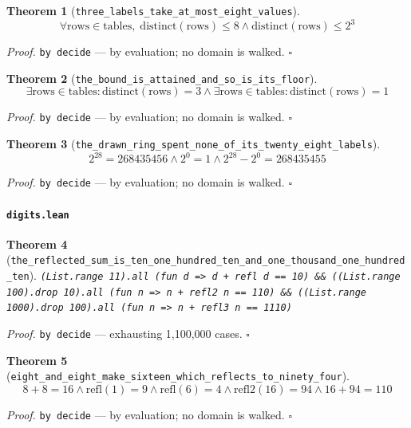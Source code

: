 \documentclass[11pt]{article}
\newtheorem{theorem}{Theorem}[section]
\begin{document}
\begin{theorem}[\texttt{three\_labels\_take\_at\_most\_eight\_values}]
\[ \forall \mathrm{rows} \in \mathrm{tables},\; \mathrm{distinct}\mathopen{}\left(\mathrm{rows}\right) \le 8 \land \mathrm{distinct}\mathopen{}\left(\mathrm{rows}\right) \le 2^{3} \]
\end{theorem}
\noindent\emph{Proof.} \texttt{by decide} --- by evaluation; no domain is walked. \hfill$\square$

\begin{theorem}[\texttt{the\_bound\_is\_attained\_and\_so\_is\_its\_floor}]
\[ \exists \mathrm{rows} \in \mathrm{tables} : \mathrm{distinct}\mathopen{}\left(\mathrm{rows}\right) = 3 \land \exists \mathrm{rows} \in \mathrm{tables} : \mathrm{distinct}\mathopen{}\left(\mathrm{rows}\right) = 1 \]
\end{theorem}
\noindent\emph{Proof.} \texttt{by decide} --- by evaluation; no domain is walked. \hfill$\square$

\begin{theorem}[\texttt{the\_drawn\_ring\_spent\_none\_of\_its\_twenty\_eight\_labels}]
\[ 2^{28} = 268435456 \land 2^{0} = 1 \land 2^{28} - 2^{0} = 268435455 \]
\end{theorem}
\noindent\emph{Proof.} \texttt{by decide} --- by evaluation; no domain is walked. \hfill$\square$

\paragraph{\texttt{digits.lean}}

\begin{theorem}[\texttt{the\_reflected\_sum\_is\_ten\_one\_hundred\_ten\_and\_one\_thousand\_one\_hundred\_ten}]
\texttt{(List.range 11).all (fun d => d + refl d == 10) \&\& ((List.range 100).drop 10).all (fun n => n + refl2 n == 110) \&\& ((List.range 1000).drop 100).all (fun n => n + refl3 n == 1110)}
\end{theorem}
\noindent\emph{Proof.} \texttt{by decide} --- exhausting 1,100,000 cases. \hfill$\square$

\begin{theorem}[\texttt{eight\_and\_eight\_make\_sixteen\_which\_reflects\_to\_ninety\_four}]
\[ 8 + 8 = 16 \land \mathrm{refl}\mathopen{}\left(1\right) = 9 \land \mathrm{refl}\mathopen{}\left(6\right) = 4 \land \mathrm{refl2}\mathopen{}\left(16\right) = 94 \land 16 + 94 = 110 \]
\end{theorem}
\noindent\emph{Proof.} \texttt{by decide} --- by evaluation; no domain is walked. \hfill$\square$
\end{document}
